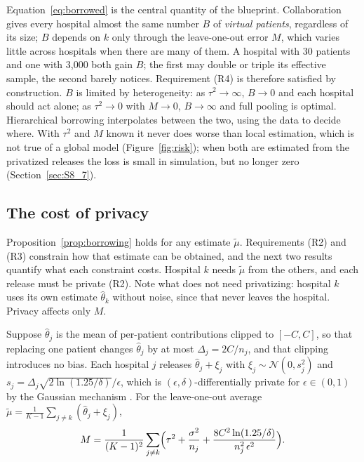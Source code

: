 \documentclass[acmsmall,screen,review]{acmart}
\theoremstyle{acmdefinition}
\begin{document}
Equation~\eqref{eq:borrowed} is the central quantity of the blueprint. Collaboration gives every hospital almost the same number $B$ of \emph{virtual patients}, regardless of its size; $B$ depends on $k$ only through the leave-one-out error $M$, which varies little across hospitals when there are many of them. A hospital with 30 patients and one with 3,000 both gain $B$; the first may double or triple its effective sample, the second barely notices. Requirement (R4) is therefore satisfied by construction. $B$ is limited by heterogeneity: as $\tau^2\to\infty$, $B\to 0$ and each hospital should act alone; as $\tau^2\to 0$ with $M\to 0$, $B\to\infty$ and full pooling is optimal. Hierarchical borrowing interpolates between the two, using the data to decide where. With $\tau^2$ and $M$ known it never does worse than local estimation, which is not true of a global model (Figure~\ref{fig:risk}); when both are estimated from the privatized releases the loss is small in simulation, but no longer zero (Section~\ref{sec:S8_7}).

\subsection{The cost of privacy}\label{sec:S8_3}

Proposition~\ref{prop:borrowing} holds for any estimate $\tilde{\mu}$. Requirements (R2) and (R3) constrain how that estimate can be obtained, and the next two results quantify what each constraint costs. Hospital $k$ needs $\tilde{\mu}$ from the others, and each release must be private (R2). Note what does not need privatizing: hospital $k$ uses its own estimate $\hat{\theta}_k$ without noise, since that never leaves the hospital. Privacy affects only $M$.

\begin{proposition}\label{prop:privatized}
Suppose $\hat{\theta}_j$ is the mean of per-patient contributions clipped to $[-C,C]$, so that replacing one patient changes $\hat{\theta}_j$ by at most $\Delta_j=2C/n_j$, and that clipping introduces no bias. Each hospital $j$ releases $\hat{\theta}_j+\xi_j$ with $\xi_j\sim\mathcal{N}(0,s_j^2)$ and $s_j=\Delta_j\sqrt{2\ln(1.25/\delta)}/\epsilon$, which is $(\epsilon,\delta)$-differentially private for $\epsilon\in(0,1)$ by the Gaussian mechanism \cite{dwork2014algorithmic}. For the leave-one-out average $\tilde{\mu}=\frac{1}{K-1}\sum_{j\neq k}(\hat{\theta}_j+\xi_j)$,
\begin{equation}\label{eq:M}
M=\frac{1}{(K-1)^2}\sum_{j\neq k}\Bigl(\tau^2+\frac{\sigma^2}{n_j}+\frac{8C^2\ln(1.25/\delta)}{n_j^2\,\epsilon^2}\Bigr).
\end{equation}
\end{proposition}
\end{document}
